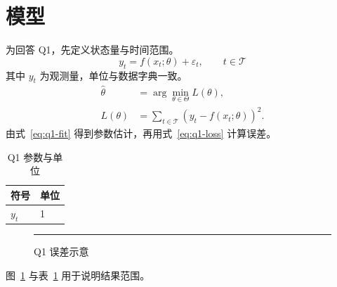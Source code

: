 \documentclass{ctexart}
\begin{document}
\section{模型}
为回答 Q1，先定义状态量与时间范围。
\begin{equation}
  y_t = f(x_t;\theta)+\varepsilon_t,\qquad t\in\mathcal T
  \label{eq:q1-observation}
\end{equation}
其中 $y_t$ 为观测量，单位与数据字典一致。
\begin{align}
  \widehat{\theta} &= \arg\min_{\theta\in\Theta} L(\theta),
    \label{eq:q1-fit}\\
  L(\theta) &= \sum_{t\in\mathcal T} (y_t-f(x_t;\theta))^2.
    \label{eq:q1-loss}
\end{align}
由式~\eqref{eq:q1-fit} 得到参数估计，再用式~\eqref{eq:q1-loss} 计算误差。
\begin{table}[htbp]
  \centering
  \caption{Q1 参数与单位}
  \label{tab:q1-parameters}
  \begin{tabular}{@{}ll@{}}
    \toprule
    符号 & 单位 \\
    \midrule
    $y_t$ & 1 \\
    \bottomrule
  \end{tabular}
\end{table}
\begin{figure}[htbp]
  \centering
  \rule{0.5\linewidth}{0.2\linewidth}
  \caption{Q1 误差示意}
  \label{fig:q1-error}
\end{figure}
图~\ref{fig:q1-error} 与表~\ref{tab:q1-parameters} 用于说明结果范围。
\end{document}

